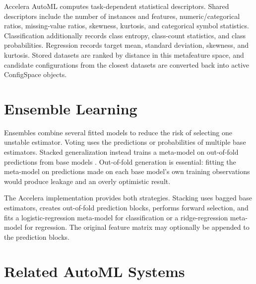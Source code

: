 \documentclass[12pt,a4paper,oneside]{report}
\newcommand{\systemname}{Accelera AutoML}
\begin{document}
\medskip

\noindent \systemname{} computes task-dependent statistical descriptors. Shared
descriptors include the number of instances and features, numeric/categorical
ratios, missing-value ratios, skewness, kurtosis, and categorical symbol
statistics. Classification additionally records class entropy, class-count
statistics, and class probabilities. Regression records target mean, standard
deviation, skewness, and kurtosis. Stored datasets are ranked by distance in
this metafeature space, and candidate configurations from the closest datasets
are converted back into active ConfigSpace objects.

\section{Ensemble Learning}

Ensembles combine several fitted models to reduce the risk of selecting one
unstable estimator. Voting uses the predictions or probabilities of multiple
base estimators. Stacked generalization instead trains a meta-model on
out-of-fold predictions from base models \cite{stacking}. Out-of-fold
generation is essential: fitting the meta-model on predictions made on each
base model's own training observations would produce leakage and an overly
optimistic result.

\medskip

\noindent The Accelera implementation provides both strategies. Stacking uses bagged
base estimators, creates out-of-fold prediction blocks, performs forward
selection, and fits a logistic-regression meta-model for classification or a
ridge-regression meta-model for regression. The original feature matrix may
optionally be appended to the prediction blocks.

\section{Related AutoML Systems}
\end{document}
